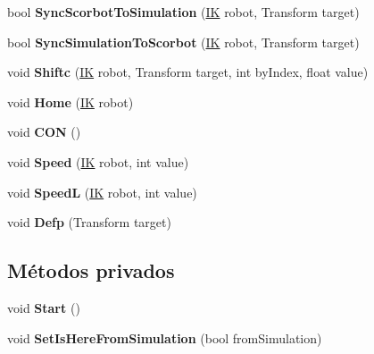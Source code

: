 \begin{DoxyCompactItemize}
\mbox{\label{class_command_control_a69ae96214c4e9cd5f8d3ded57cfe9ba3}} 
bool {\bfseries Sync\+Scorbot\+To\+Simulation} (\mbox{\hyperlink{class_i_k}{IK}} robot, Transform target)
\item 
\mbox{\label{class_command_control_aaa99e27c42b07a387f90af03540ba601}} 
bool {\bfseries Sync\+Simulation\+To\+Scorbot} (\mbox{\hyperlink{class_i_k}{IK}} robot, Transform target)
\item 
\mbox{\label{class_command_control_a2de00fee85f608fefc888d987f889af4}} 
void {\bfseries Shiftc} (\mbox{\hyperlink{class_i_k}{IK}} robot, Transform target, int by\+Index, float value)
\item 
\mbox{\label{class_command_control_adae6d4a043a93ded9d51679d78e24ce4}} 
void {\bfseries Home} (\mbox{\hyperlink{class_i_k}{IK}} robot)
\item 
\mbox{\label{class_command_control_a951dd9ecf782547f973c12db75c6f29a}} 
void {\bfseries C\+ON} ()
\item 
\mbox{\label{class_command_control_a7f9634a3a5d21f875edd276f2b06cadb}} 
void {\bfseries Speed} (\mbox{\hyperlink{class_i_k}{IK}} robot, int value)
\item 
\mbox{\label{class_command_control_a05bef86b53aac0d93fea4c255dbe5f86}} 
void {\bfseries SpeedL} (\mbox{\hyperlink{class_i_k}{IK}} robot, int value)
\item 
\mbox{\label{class_command_control_ada99694b0c348a0256faebab0899333b}} 
void {\bfseries Defp} (Transform target)
\end{DoxyCompactItemize}
\subsection*{Métodos privados}
\begin{DoxyCompactItemize}
\item 
\mbox{\label{class_command_control_a2a867f63b6c89f2864cac9d7126614d5}} 
void {\bfseries Start} ()
\item 
\mbox{\label{class_command_control_a5b525d701e0c8d6d57e9c7144aa0df44}} 
void {\bfseries Set\+Is\+Here\+From\+Simulation} (bool from\+Simulation)
\end{DoxyCompactItemize}
